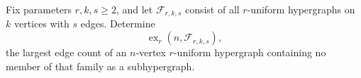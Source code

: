 Fix parameters $r,k,s\geq2$, and let $\mathcal F_{r,k,s}$ consist of all $r$-uniform hypergraphs on $k$ vertices with $s$ edges. Determine
\[
\operatorname{ex}_r(n,\mathcal F_{r,k,s}),
\]
the largest edge count of an $n$-vertex $r$-uniform hypergraph containing no member of that family as a subhypergraph.
